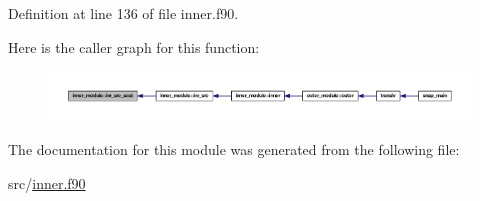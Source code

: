 Definition at line 136 of file inner.\-f90.



Here is the caller graph for this function\-:\nopagebreak
\begin{figure}[H]
\begin{center}
\leavevmode
\includegraphics[width=350pt]{classinner__module_ab4e7dc903de165ff491549c87e4d886b_icgraph}
\end{center}
\end{figure}




The documentation for this module was generated from the following file\-:\begin{DoxyCompactItemize}
\item 
src/\hyperlink{inner_8f90}{inner.\-f90}\end{DoxyCompactItemize}
